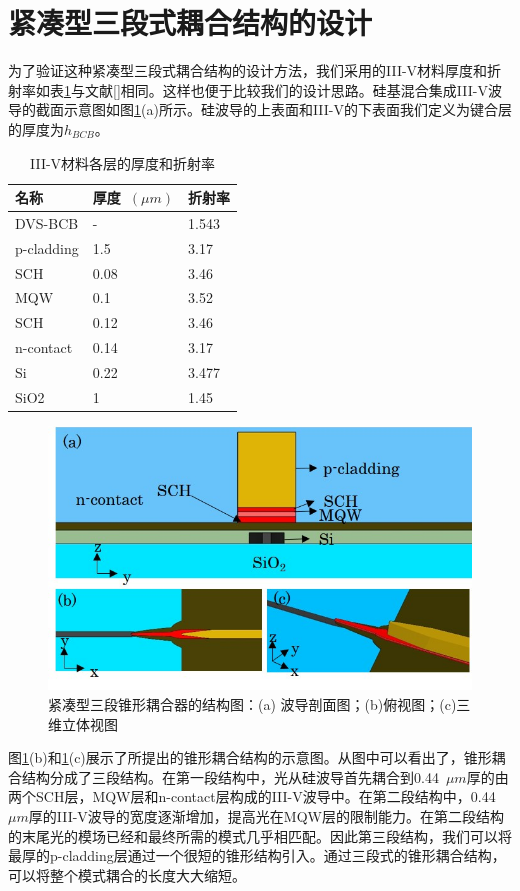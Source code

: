 \section{紧凑型三段式耦合结构的设计}
为了验证这种紧凑型三段式耦合结构的设计方法，我们采用的III-V材料厚度和折射率如表\ref{IIIV_qian_str}与文献[]相同。这样也便于比较我们的设计思路。硅基混合集成III-V波导的截面示意图如图\ref{fig_ch3_3d_taper}(a)所示。硅波导的上表面和III-V的下表面我们定义为键合层的厚度为$h_{BCB}$。
{
	\begin{table}[htb]
		\caption{III-V材料各层的厚度和折射率}
		\label{IIIV_qian_str}
		\centering
		\begin{tabular}[t]{lll}
			\hline
			名称  & 厚度~$(\mu m)$  & 折射率 \\
			\hline
			DVS-BCB & - & 1.543\\
			p-cladding & 1.5 &3.17 \\
			SCH & 0.08 & 3.46 \\
			MQW & 0.1 & 3.52 \\
			SCH & 0.12 & 3.46 \\
			n-contact & 0.14 & 3.17 \\
			Si & 0.22 & 3.477 \\
			SiO2 & 1 & 1.45 \\
			\hline
		\end{tabular}
	\end{table}
}

\begin{figure}[htb]
	\centering
	\includegraphics[width=12cm]{./Pictures/fig_ch3_3d_taper.jpg}
	\caption{紧凑型三段锥形耦合器的结构图：(a) 波导剖面图；(b)俯视图；(c)三维立体视图}
	\label{fig_ch3_3d_taper}
\end{figure}


图\ref{fig_ch3_3d_taper}(b)和\ref{fig_ch3_3d_taper}(c)展示了所提出的锥形耦合结构的示意图。从图中可以看出了，锥形耦合结构分成了三段结构。在第一段结构中，光从硅波导首先耦合到0.44~$\mu m$厚的由两个SCH层，MQW层和n-contact层构成的III-V波导中。在第二段结构中，0.44~$\mu m$厚的III-V波导的宽度逐渐增加，提高光在MQW层的限制能力。在第二段结构的末尾光的模场已经和最终所需的模式几乎相匹配。因此第三段结构，我们可以将最厚的p-cladding层通过一个很短的锥形结构引入。通过三段式的锥形耦合结构，可以将整个模式耦合的长度大大缩短。

